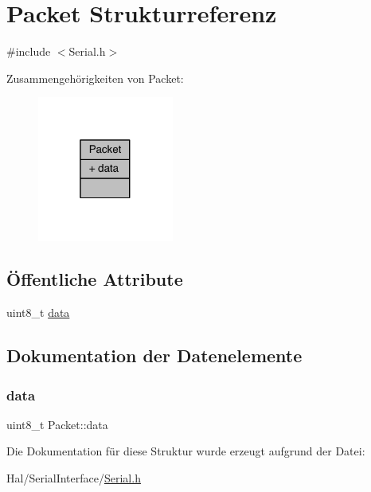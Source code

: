 \hypertarget{struct_packet}{}\section{Packet Strukturreferenz}
\label{struct_packet}


{\ttfamily \#include $<$Serial.\+h$>$}



Zusammengehörigkeiten von Packet\+:\nopagebreak
\begin{figure}[H]
\begin{center}
\leavevmode
\includegraphics[width=127pt]{struct_packet__coll__graph}
\end{center}
\end{figure}
\subsection*{Öffentliche Attribute}
\begin{DoxyCompactItemize}
\item 
uint8\+\_\+t \hyperlink{struct_packet_a9c0a7fd8ec507914a389ed190ca3c51f}{data}
\end{DoxyCompactItemize}


\subsection{Dokumentation der Datenelemente}
\hypertarget{struct_packet_a9c0a7fd8ec507914a389ed190ca3c51f}{}\label{struct_packet_a9c0a7fd8ec507914a389ed190ca3c51f} 
\subsubsection{\texorpdfstring{data}{data}}
{\footnotesize\ttfamily uint8\+\_\+t Packet\+::data}



Die Dokumentation für diese Struktur wurde erzeugt aufgrund der Datei\+:\begin{DoxyCompactItemize}
\item 
Hal/\+Serial\+Interface/\hyperlink{_serial_8h}{Serial.\+h}\end{DoxyCompactItemize}
